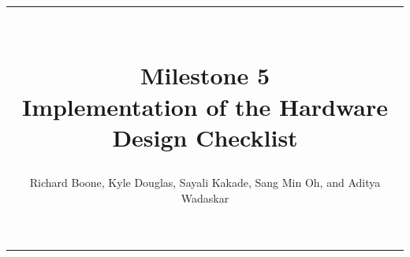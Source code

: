 \documentclass[12pt]{article}
\title{\rule{7in}{1pt} \\
	Milestone 5 \\ 
	\Large Implementation of the Hardware Design Checklist}
\author{Richard Boone, Kyle Douglas, Sayali Kakade, Sang Min Oh, and Aditya Wadaskar}
\begin{document}
\maketitle\vspace{-45pt}

\begin{center}
\rule{7in}{1pt}
\end{center}

\end{document}
